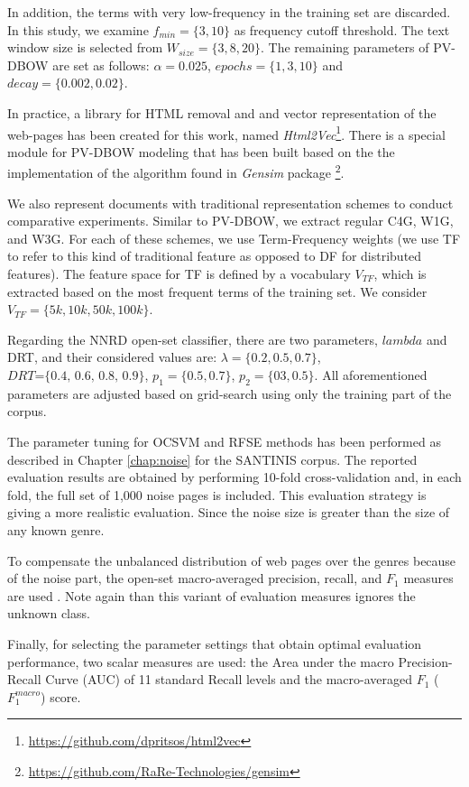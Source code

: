 In addition, the terms with very low-frequency in the training set are discarded. In this study, we examine $f_{min}=\{3,10\}$ as frequency cutoff threshold. The text window size is selected from $W_{size}=\{3,8,20\}$. The remaining parameters of PV-DBOW are set as follows: $\alpha=0.025$, $epochs=\{1, 3, 10\}$ and $decay=\{0.002, 0.02\}$. 

In practice, a library for HTML removal and and vector representation of the web-pages has been created for this work, named  \textit{Html2Vec}\footnote{\url{https://github.com/dpritsos/html2vec}}. There is a special module for PV-DBOW modeling that has been built based on the the implementation of the algorithm found in \textit{Gensim} package \footnote{\url{https://github.com/RaRe-Technologies/gensim}}. 

We also represent documents with traditional representation schemes to conduct comparative experiments. Similar to PV-DBOW, we extract regular C4G, W1G, and W3G. For each of these schemes, we use Term-Frequency weights (we use TF to refer to this kind of traditional feature as opposed to DF for distributed features). The feature space for TF is defined by a vocabulary $V_{TF}$, which is extracted based on the most frequent terms of the training set. We consider $V_{TF}=\{5k,10k,50k,100k\}$. 

Regarding the NNRD open-set classifier, there are two parameters, $lambda$ and DRT, and their considered values are: $\lambda =\{0.2, 0.5, 0.7\}$, $DRT\textit{=\{0.4, 0.6, 0.8, 0.9\}}$, $p_{1} = \{0.5, 0.7\}$, $p_{2} = \{03, 0.5\}$. All aforementioned parameters are adjusted based on grid-search using only the training part of the corpus.

The parameter tuning for OCSVM and RFSE methods has been performed as described in Chapter \ref{chap:noise} for the SANTINIS corpus. The reported evaluation results are obtained by performing 10-fold cross-validation and, in each fold, the full set of 1,000 noise pages is included. This evaluation strategy is giving a more realistic evaluation. Since the noise size is greater than the size of any known genre.

To compensate the unbalanced distribution of web pages over the genres because of the noise part, the open-set macro-averaged precision, recall, and $F_{1}$ measures are used \parencite{mendesjunior2016}. Note again than this variant of evaluation measures ignores the unknown class.  

Finally, for selecting the parameter settings that obtain optimal evaluation performance, two scalar measures are used: the Area under the macro Precision-Recall Curve (AUC) of 11 standard Recall levels and the macro-averaged $F_{1}$ ($F_1^{macro}$) score.

